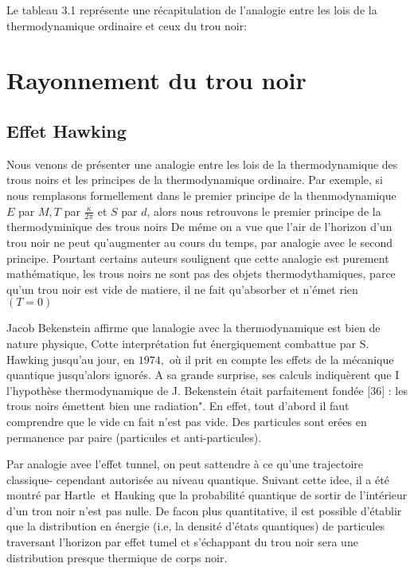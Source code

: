 \documentclass[12pt,  a4paper, openright]{report} %
\begin{document}
Le tableau 3.1 représente une récapitulation de l'analogie entre les lois de la thermodynamique ordinaire et ceux du trou noir:




\section { Rayonnement du trou noir}
\subsection {Effet Hawking}
Nous venons de présenter une analogie entre les lois de la thermodynamique des trous noirs et les principes de la thermodynamique ordinaire. Par exemple, si nous remplasons formellement dans le premier principe de la thenmodynamique $E$ par $M, T$ par $\frac{\kappa}{2 \pi}$ et $S$ par $d$, alors nous retrouvons le premier principe de la thermodyminique des trous noirs  De méme on a vue que l'air de l'horizon d'un trou noir ne peut qu'augmenter au cours du temps, par analogie avec le second principe.
 Pourtant certains auteurs soulignent que cette analogie est purement mathématique, les trous noirs ne sont pas des objets thermodythamiques, parce qu'un trou noir est vide de matiere, il ne fait qu'absorber et n'émet rien $(T=0)$

Jacob Bekenstein affirme que lanalogie avec la thermodynamique est bien de nature physique, Cotte interprétation fut énergiquement combattue par S. Hawking jusqu'au jour, en $1974,$ où il prit en compte les effets de la mécanique quantique jusqu'alors ignorés. A sa grande surprise, ses calculs indiquèrent que I l'hypothèse thermodynamique de J. Bekenstein était parfaitement fondée [36] :
les trous noirs émettent bien une radiation".
En effet, tout d'abord il faut comprendre que le vide $\mathrm{cn}$ fait n'est pas vide. Des particules sont erées en permanence par paire (particules et anti-particules).

Par analogie avee l'effet tunnel, on peut sattendre à ce qu'une trajectoire classique-
cependant autorisée au niveau quantique. Suivant cette idee, il a été montré par $\mathrm{Hartle } ~$ et Hauking que la probabilité quantique de sortir de l'intérieur d'un tron noir n'est pas nulle. De facon plus quantitative, il est possible d'établir que la distribution en énergie (i.e, la densité d'états quantiques) de particules traversant l'horizon par effet tumel et s'échappant du trou noir sera une distribution presque thermique de corps noir.
\end{document}

